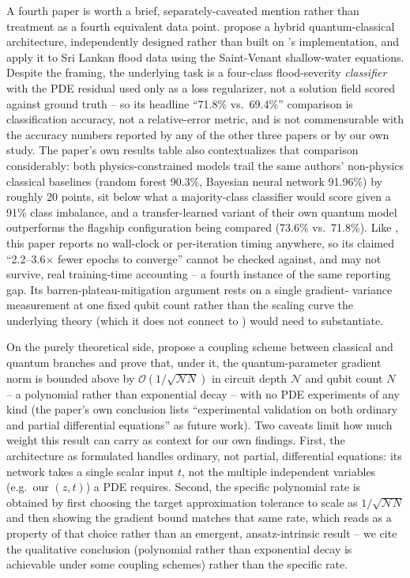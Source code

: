 A fourth paper is worth a brief, separately-caveated mention rather than
treatment as a fourth equivalent data point.
\citet{hqcpinn2026hydro} propose a hybrid quantum-classical architecture,
independently designed rather than built on \citet{farea2025qcpinn}'s
implementation, and apply it to Sri Lankan flood data using the
Saint-Venant shallow-water equations. Despite the framing, the underlying
task is a four-class flood-severity \emph{classifier} with the PDE
residual used only as a loss regularizer, not a solution field scored
against ground truth -- so its headline ``71.8\% vs.\ 69.4\%'' comparison
is classification accuracy, not a relative-error metric, and is not
commensurable with the accuracy numbers reported by any of the other three
papers or by our own study. The paper's own results table also
contextualizes that comparison considerably: both physics-constrained
models trail the same authors' non-physics classical baselines (random
forest 90.3\%, Bayesian neural network 91.96\%) by roughly 20 points, sit
below what a majority-class classifier would score given a 91\% class
imbalance, and a transfer-learned variant of their own quantum model
outperforms the flagship configuration being compared (73.6\% vs.\ 71.8\%).
Like \citet{qcpinn2025reservoir}, this paper reports no wall-clock or
per-iteration timing anywhere, so its claimed ``2.2--3.6$\times$ fewer
epochs to converge'' cannot be checked against, and may not survive,
real training-time accounting -- a fourth instance of the same reporting
gap. Its barren-plateau-mitigation argument rests on a single gradient-
variance measurement at one fixed qubit count rather than the scaling
curve the underlying theory (which it does not connect to
\citealp{holmes2022expressibility}) would need to substantiate.

On the purely theoretical side, \citet{qpinnmac2025} propose a coupling
scheme between classical and quantum branches and prove that, under it,
the quantum-parameter gradient norm is bounded above by
$\mathcal{O}(1/\sqrt{\mathcal{N}N})$ in circuit depth $\mathcal{N}$ and
qubit count $N$ -- a polynomial rather than exponential decay -- with no
PDE experiments of any kind (the paper's own conclusion lists
``experimental validation on both ordinary and partial differential
equations'' as future work). Two caveats limit how much weight this result
can carry as context for our own findings. First, the architecture as
formulated handles ordinary, not partial, differential equations: its
network takes a single scalar input $t$, not the multiple independent
variables (e.g.\ our $(z,t)$) a PDE requires. Second, the specific
polynomial rate is obtained by first choosing the target approximation
tolerance to scale as $1/\sqrt{\mathcal{N}N}$ and then showing the
gradient bound matches that same rate, which reads as a property of that
choice rather than an emergent, ansatz-intrinsic result -- we cite the
qualitative conclusion (polynomial rather than exponential decay is
achievable under some coupling schemes) rather than the specific rate.

